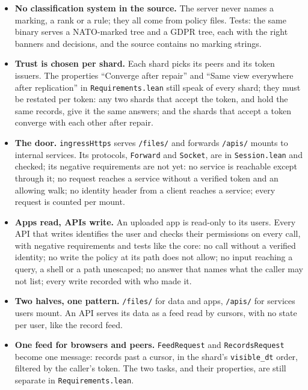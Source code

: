 \begin{itemize}
\begin{itemize}
  \end{itemize}
  A caller who already knows a hidden path learns nothing from asking for it: the
  answer is the same as for a path that never existed.
\item \textbf{No classification system in the source.} The server never names a
  marking, a rank or a rule; they all come from policy files. Tests: the same
  binary serves a NATO-marked tree and a GDPR tree, each with the right banners
  and decisions, and the source contains no marking strings.
\item \textbf{Trust is chosen per shard.} Each shard picks its peers and its token
  issuers. The properties ``Converge after repair'' and ``Same view everywhere
  after replication'' in \texttt{Requirements.lean} still speak of every shard;
  they must be restated per token: any two shards that accept the token, and hold
  the same records, give it the same answers; and the shards that accept a token
  converge with each other after repair.
\item \textbf{The door.} \texttt{ingressHttps} serves \texttt{/files/} and forwards
  \texttt{/apis/} mounts to internal services. Its protocols, \texttt{Forward} and
  \texttt{Socket}, are in \texttt{Session.lean} and checked; its negative
  requirements are not yet: no service is reachable except through it; no request
  reaches a service without a verified token and an allowing walk; no identity
  header from a client reaches a service; every request is counted per mount.
\item \textbf{Apps read, APIs write.} An uploaded app is read-only to its users.
  Every API that writes identifies the user and checks their permissions on every
  call, with negative requirements and tests like the core: no call without a
  verified identity; no write the policy at its path does not allow; no input
  reaching a query, a shell or a path unescaped; no answer that names what the
  caller may not list; every write recorded with who made it.
\item \textbf{Two halves, one pattern.} \texttt{/files/} for data and apps,
  \texttt{/apis/} for services users mount. An API serves its data as a feed read
  by cursors, with no state per user, like the record feed.
\item \textbf{One feed for browsers and peers.} \texttt{FeedRequest} and
  \texttt{RecordsRequest} become one message: records past a cursor, in the
  shard's \texttt{visible\_dt} order, filtered by the caller's token. The two
  tasks, and their properties, are still separate in \texttt{Requirements.lean}.

\end{itemize}
